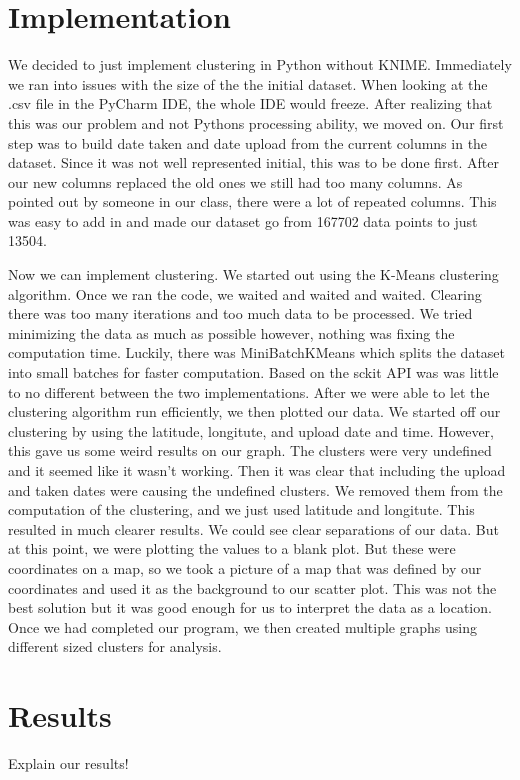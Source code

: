 \documentclass{article}
\begin{document}
\section*{Implementation}
\par
We decided to just implement clustering in Python without KNIME. Immediately we ran into issues with the size of the the initial dataset.
When looking at the .csv file in the PyCharm IDE, the whole IDE would freeze. After realizing that this was our problem and not Pythons processing 
ability, we moved on. Our first step was to build date taken and date upload from the current columns in the dataset. Since it was not well 
represented initial, this was to be done first. After our new columns replaced the old ones we still had too many columns. As pointed out 
by someone in our class, there were a lot of repeated columns. This was easy to add in and made our dataset go from 167702 
data points to just 13504. 
\par 
Now we can implement clustering. We started out using the K-Means clustering algorithm. Once we ran the code, we waited and waited and waited.
Clearing there was too many iterations and too much data to be processed. We tried minimizing the data as much as possible however, nothing
was fixing the computation time. Luckily, there was MiniBatchKMeans which splits the dataset into small batches for faster computation. 
Based on the sckit API was was little to no different between the two implementations. After we were able to let the 
clustering algorithm run efficiently, we then plotted our data. We started off our clustering by using the latitude, longitute, and upload date and time. 
However, this gave us some weird results on our graph. The clusters were very undefined and it seemed like it wasn't working. Then it was
clear that including the upload and taken dates were causing the undefined clusters. We removed them from the computation of the clustering, and 
we just used latitude and longitute. This resulted in much clearer results. We could see clear separations of our data. But at this point, 
we were plotting the values to a blank plot. But these were coordinates on a map, so we took a picture of a map that was defined by our coordinates
and used it as the background to our scatter plot. This was not the best solution but it was good enough for us to interpret the data as a location. 
Once we had completed our program, we then created multiple graphs using different sized clusters for analysis. 


\section*{Results}
Explain our results!
\end{document}
